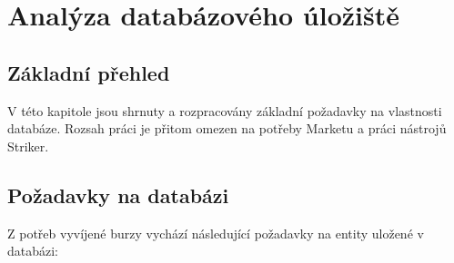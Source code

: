 \documentclass[thesis=M,czech]{FITthesis}[2012/06/26]
\begin{document}

\chapter{Analýza databázového úložiště}

\section{Základní přehled}

V této kapitole jsou shrnuty a rozpracovány základní požadavky na vlastnosti databáze. Rozsah práci je přitom omezen 
na potřeby Marketu a práci nástrojů Striker.



\section{Požadavky na databázi}

Z potřeb vyvíjené burzy vychází následující požadavky na entity uložené v databázi:
\end{document}
